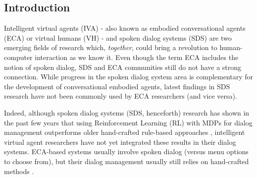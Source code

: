 \begin{sloppy}
\section{Introduction}
\label{intro}

Intelligent virtual agents (IVA) - also known as embodied conversational agents (ECA) or virtual humans (VH) - and spoken dialog systems (SDS) are two emerging fields of research which, {\em together}, could bring a revolution to human-computer interaction as we know it. Even though the term ECA includes the notion of spoken dialog, SDS and ECA communities  still do not have a strong connection. While  progress in the spoken dialog system area is complementary for the development of conversational embodied agents,  latest findings in SDS research have not been commonly used by ECA researchers (and vice versa).

Indeed, although spoken dialog systems (SDS, henceforth) research has shown in the past few years that using Reinforcement Learning (RL) with MDPs for dialog management outperforms older hand-crafted rule-based approaches \cite{frampton2009,young2013pomdp}, intelligent virtual agent researchers have not yet integrated these results in their dialog systems.  ECA-based systems usually involve spoken dialog (versus menu options to choose from), but their dialog management usually still relies on hand-crafted methods \cite{morbiniFlores2012,Bickmore2010}.


%


\end{sloppy}
